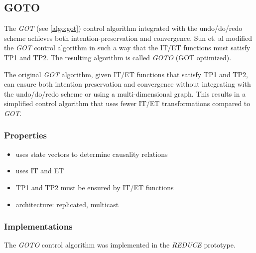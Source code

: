 \subsection{GOTO}
\label{algo:goto}

The \emph{GOT} (see \ref{algo:got}) control algorithm integrated with the undo/do/redo scheme achieves both intention-preservation and convergence. Sun et. al \cite{sun98b} modified the \emph{GOT} control algorithm in such a way that the IT/ET functions must satisfy TP1 and TP2. The resulting algorithm is called \emph{GOTO} (GOT optimized).

The original \emph{GOT} algorithm, given IT/ET functions that satisfy TP1 and TP2, can ensure both intention preservation and convergence without integrating with the undo/do/redo scheme or using a multi-dimensional graph. This results in a simplified control algorithm that uses fewer IT/ET transformations compared to \emph{GOT}.


\subsubsection{Properties}
\begin{itemize}
 \item uses state vectors to determine causality relations
 \item uses IT and ET
 \item TP1 and TP2 must be ensured by IT/ET functions
 \item architecture: replicated, multicast
\end{itemize}


\subsubsection{Implementations}
The \emph{GOTO} control algorithm was implemented in the \emph{REDUCE} \cite{sun00a} prototype. 
